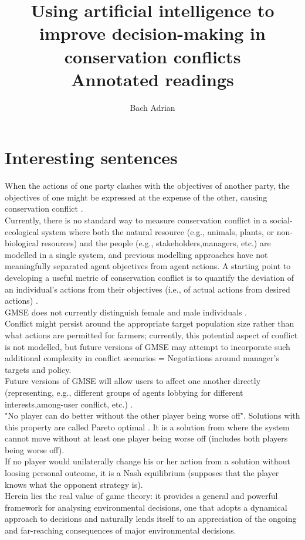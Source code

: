 \documentclass[12pt]{article}
\title{Using artificial intelligence to improve decision-making in conservation conflicts \\\medskip Annotated readings}
\author{Bach Adrian}
\begin{document}
\maketitle

\tableofcontents

\section*{Interesting sentences}
When  the  actions  of  one  party  clashes  with  the  objectives  of  another  party,  the  objectives of  one  might  be  expressed  at  the  expense  of  the  other,  causing  conservation  conflict \citep{duthie2018}.\\
Currently,  there  is  no  standard  way  to  measure  conservation  conflict  in  a  social-ecological  system  where  both the  natural  resource  (e.g.,  animals,  plants,  or  non-biological  resources)  and  the  people  (e.g.,  stakeholders,managers,  etc.)  are  modelled  in  a  single  system,  and  previous  modelling  approaches  have  not  meaningfully separated  agent  objectives  from  agent  actions. A  starting  point  to  developing  a  useful  metric of  conservation  conflict  is  to  quantify  the  deviation  of  an  individual’s  actions  from  their  objectives  (i.e.,  of actual  actions  from  desired  actions) \citep{duthie2018}.\\
GMSE  does  not  currently distinguish  female  and  male  individuals \citep{duthie2018}.\\
Conflict  might  persist  around  the  appropriate  target  population  size  rather  than  what actions  are  permitted  for  farmers;  currently,  this  potential  aspect  of  conflict  is  not  modelled,  but  future versions  of  GMSE  may  attempt  to  incorporate  such  additional  complexity  in  conflict  scenarios \citep{duthie2018} = Negotiations around manager's targets and policy.\\
Future  versions  of  GMSE  will  allow  users  to affect  one  another  directly  (representing,  e.g.,  different  groups  of  agents  lobbying  for  different  interests,among-user  conflict,  etc.) \citep{duthie2018}.\\
"No player can do better without the other player being worse off". Solutions with this property are called Pareto optimal \citep{COLYVAN20111246}. It is a solution from where the system cannot move without at least one player being worse off (includes both players being worse off).\\
If no player would unilaterally change his or her action from a solution without loosing personal outcome, it is a Nash equilibrium (supposes that the player knows what the opponent strategy is).\\
Herein lies
the real value of game theory: it provides a general and powerful
framework for analysing environmental decisions, one that
adopts a dynamical approach to decisions and naturally lends itself to an appreciation of the ongoing and far-reaching consequences of major environmental decisions. \citep{COLYVAN20111246}\\
\end{document}
